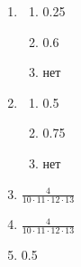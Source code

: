 \begin{enumerate}
	\item
			\begin{enumerate}
				\item 0.25
				\item 0.6
				\item нет
			\end{enumerate}
	\item
			\begin{enumerate}
				\item 0.5
				\item  0.75
				\item нет
			\end{enumerate}
	\item $\frac{4}{10 \cdot 11 \cdot 12 \cdot 13}$
	\item $\frac{4}{10 \cdot 11 \cdot 12 \cdot 13}$
	\item 0.5



\end{enumerate}

